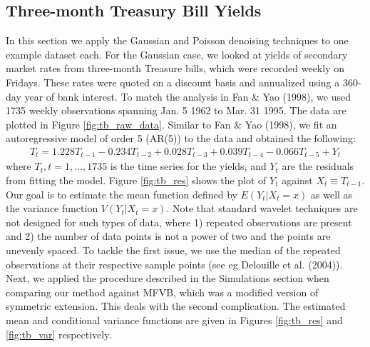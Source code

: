 \documentclass[12pt]{article}
\begin{document}
\subsection{Three-month Treasury Bill Yields}
In this section we apply the Gaussian and Poisson denoising techniques to one example dataset each. For the Gaussian case, we looked at yields of secondary market rates from three-month Treasure bills, which were recorded weekly on Fridays. These rates were quoted on a discount basis and annualized using a 360-day year of bank interest. To match the analysis in Fan \& Yao (1998), we used 1735 weekly observations spanning Jan. 5 1962 to Mar. 31 1995. The data are plotted in Figure \ref{fig:tb_raw_data}. Similar to Fan \& Yao (1998), we fit an autoregressive model of order 5 (AR(5)) to the data and obtained the following:
\begin{eqnarray}
T_t=1.228T_{t-1}-0.234T_{t-2}+0.028T_{t-3}+0.039T_{t-4}-0.066T_{t-5}+Y_t
\end{eqnarray}
where $T_t, t=1,...,1735$ is the time series for the yields, and $Y_t$ are the residuals from fitting the model. Figure \ref{fig:tb_res} shows the plot of $Y_t$ against $X_t\equiv T_{t-1}$. Our goal is to estimate the mean function defined by $E(Y_t|X_t=x)$ as well as the variance function $V(Y_t|X_t=x)$. Note that standard wavelet techniques are not designed for such types of data, where 1) repeated observations are present and 2) the number of data points is not a power of two and the points are unevenly spaced. To tackle the first issue, we use the median of the repeated observations at their respective sample points (see eg Delouille et al. (2004)). Next, we applied the procedure described in the Simulations section when comparing our method against MFVB, which was a modified version of symmetric extension. This deals with the second complication. The estimated mean and conditional variance functions are given in Figures \ref{fig:tb_res} and \ref{fig:tb_var} respectively.\bigskip\\
\end{document}
